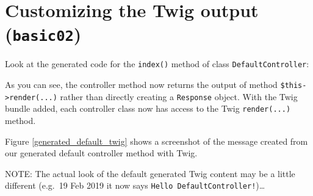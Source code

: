 \documentclass[a4paperpaper,openright]{book}
\newenvironment{Shaded}{}{}
\newcommand{\AnnotationTok}[1]{\textcolor[rgb]{0.38,0.63,0.69}{\textbf{\textit{#1}}}}
\newcommand{\CommentTok}[1]{\textcolor[rgb]{0.38,0.63,0.69}{\textit{#1}}}
\newcommand{\KeywordTok}[1]{\textcolor[rgb]{0.00,0.44,0.13}{\textbf{#1}}}
\newcommand{\NormalTok}[1]{#1}
\newcommand{\OtherTok}[1]{\textcolor[rgb]{0.00,0.44,0.13}{#1}}
\newcommand{\StringTok}[1]{\textcolor[rgb]{0.25,0.44,0.63}{#1}}
\begin{document}
\hypertarget{customizing-the-twig-output-basic02}{%
\section{\texorpdfstring{Customizing the Twig output
(\texttt{basic02})}{Customizing the Twig output (basic02)}}\label{customizing-the-twig-output-basic02}}

Look at the generated code for the \texttt{index()} method of class
\texttt{DefaultController}:

\begin{Shaded}
\end{Shaded}

As you can see, the controller method now returns the output of method
\texttt{\$this-\textgreater{}render(...)} rather than directly creating
a \texttt{Response} object. With the Twig bundle added, each controller
class now has access to the Twig \texttt{render(...)} method.

Figure \ref{generated_default_twig} shows a screenshot of the message
created from our generated default controller method with Twig.

NOTE: The actual look of the default generated Twig content may be a
little different (e.g.~19 Feb 2019 it now says
\texttt{Hello\ DefaultController!})\ldots{}
\end{document}
